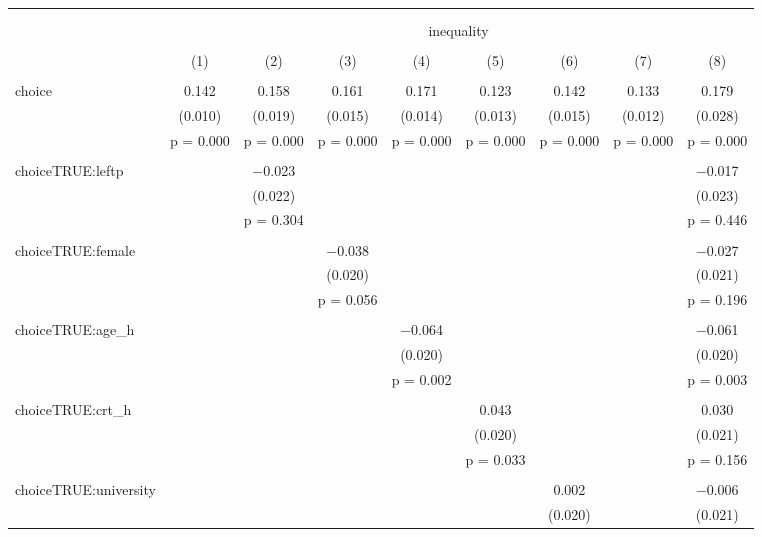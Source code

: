 
\begin{table}[!htbp] \centering 
  \caption{} 
  \label{tbl:o2} 
\begin{tabular}{@{\extracolsep{5pt}}lcccccccc} 
\\[-1.8ex]\hline 
\hline \\[-1.8ex] 
\\[-1.8ex] & \multicolumn{8}{c}{inequality} \\ 
\\[-1.8ex] & (1) & (2) & (3) & (4) & (5) & (6) & (7) & (8)\\ 
\hline \\[-1.8ex] 
 choice & 0.142 & 0.158 & 0.161 & 0.171 & 0.123 & 0.142 & 0.133 & 0.179 \\ 
  & (0.010) & (0.019) & (0.015) & (0.014) & (0.013) & (0.015) & (0.012) & (0.028) \\ 
  & p = 0.000 & p = 0.000 & p = 0.000 & p = 0.000 & p = 0.000 & p = 0.000 & p = 0.000 & p = 0.000 \\ 
  & & & & & & & & \\ 
 choiceTRUE:leftp &  & $-$0.023 &  &  &  &  &  & $-$0.017 \\ 
  &  & (0.022) &  &  &  &  &  & (0.023) \\ 
  &  & p = 0.304 &  &  &  &  &  & p = 0.446 \\ 
  & & & & & & & & \\ 
 choiceTRUE:female &  &  & $-$0.038 &  &  &  &  & $-$0.027 \\ 
  &  &  & (0.020) &  &  &  &  & (0.021) \\ 
  &  &  & p = 0.056 &  &  &  &  & p = 0.196 \\ 
  & & & & & & & & \\ 
 choiceTRUE:age\_h &  &  &  & $-$0.064 &  &  &  & $-$0.061 \\ 
  &  &  &  & (0.020) &  &  &  & (0.020) \\ 
  &  &  &  & p = 0.002 &  &  &  & p = 0.003 \\ 
  & & & & & & & & \\ 
 choiceTRUE:crt\_h &  &  &  &  & 0.043 &  &  & 0.030 \\ 
  &  &  &  &  & (0.020) &  &  & (0.021) \\ 
  &  &  &  &  & p = 0.033 &  &  & p = 0.156 \\ 
  & & & & & & & & \\ 
 choiceTRUE:university &  &  &  &  &  & 0.002 &  & $-$0.006 \\ 
  &  &  &  &  &  & (0.020) &  & (0.021) \\ 

\end{tabular}
\end{table}
